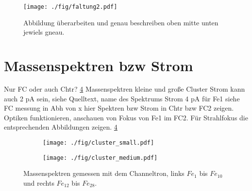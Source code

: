 \begin{figure}
    \centering
    \texttt{[image: ./fig/faltung2.pdf]}
    \caption{Abbildung überarbeiten und genau beschreiben oben mitte unten jewiels gneau.}
    \label{fig:faltung}
\end{figure}


\section{Massenspektren bzw Strom}

Nur FC oder auch Chtr? \ref{fig:cluster_chtr}
Massenspektren kleine und große Cluster
Strom kann auch 2 pA sein, siehe Quelltext, name des Spektrums %
Strom 4 pA für Fe1 siehe FC messung in Abh von x
hier Spektren bzw Strom in Chtr bzw FC2 zeigen. Optiken funktionieren, anschauen von Fokus von Fe1 im FC2.
Für Strahlfokus die entsprechenden Abbildungen zeigen.
\ref{fig:cluster_chtr}

\begin{figure}
    \begin{subfigure}[t]{0.475\textwidth}
      \texttt{[image: ./fig/cluster\_small.pdf]}
      \label{fig:cluster_small}
    \end{subfigure}\hfill
    \begin{subfigure}[t]{0.475\textwidth}
      \texttt{[image: ./fig/cluster\_medium.pdf]}
      \label{fig:cluster_medium}
    \end{subfigure}
    \caption{Massenspektren gemessen mit dem Channeltron, links $Fe_{1}$ bis $Fe_{10}$ und rechts $Fe_{12}$ bis $Fe_{28}$.} 
    \label{fig:cluster_chtr}
\end{figure}



